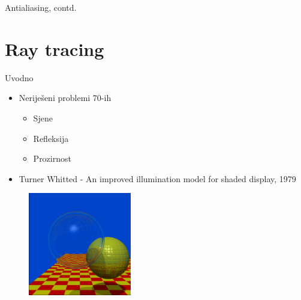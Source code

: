 \documentclass[9pt]{beamer}
\begin{document}
\begin{frame}{Antialiasing, contd.}
	
\end{frame}
\section{Ray tracing}
\begin{frame}{Uvodno}
\begin{itemize}
	\item Neriješeni problemi 70-ih
	\begin{itemize}
		\item Sjene
		\item Refleksija
		\item Prozirnost
	\end{itemize}
	\item Turner Whitted - An improved illumination model for shaded display, 1979
\end{itemize}
\begin{figure}
	\includegraphics[width=0.4\textwidth]{./slike/whitted-spheres.jpg}
\end{figure}
\end{frame}
\end{document}
